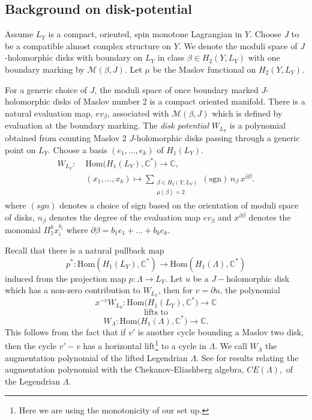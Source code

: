\documentclass[11pt, oneside,dvipsnames]{amsart}
\renewcommand{\to}{\rightarrow}
\newcommand{\Hom}{\text{Hom}}
\renewcommand{\to}{\rightarrow}
\newcommand{\<}{\langle}
\renewcommand{\>}{\rangle}
\newcommand{\bC}{\mathbb{C}}
\newcommand{\cM}{\mathcal{M}}
\renewcommand{\to}{\rightarrow}
\theoremstyle{definition}
\theoremstyle{definition}
\numberwithin{equation}{subsection}
\begin{document}
\subsection{Background on disk-potential}




Assume $L_Y$ is a compact, oriented, spin monotone Lagrangian in $Y$. Choose $J$ to be a compatible almost complex structure on $Y$. We  denote the moduli space of $J$-holomorphic disks with boundary on $L_Y$ in class $\beta \in H_2(Y,L_Y)$ with one boundary marking by $\cM(\beta, J)$.   Let $\mu$ be the Maslov functional on $H_2(Y,L_Y)$.

For a generic choice of $J$, the moduli space of once boundary marked $J$-holomorphic disks of Maslov number 2 is a compact oriented manifold. There is a natural evaluation map, $ev_\beta$, associated with $\cM(\beta,J)$ which is defined by evaluation at the boundary marking. The \textit{disk potential} $W_{L_Y}$ is a polynomial obtained from counting Maslov 2  $J$-holomorphic disks passing through a generic point on $L_Y$. Choose a basis $(e_1,\dots,e_k)$ of $H_1(L_Y)$.
\[
\begin{aligned}
W_{L_Y} :\;& \mathrm{Hom}\big(H_1(L_Y), \mathbb{C}^*\big) \longrightarrow \mathbb{C}, \\
& (x_1,\dots,x_k) \longmapsto 
\sum_{\substack{\beta \in H_2(Y,L_Y) \\ \mu(\beta)=2}}
(\mathrm{sgn})\, n_\beta \, x^{\partial \beta}.
\end{aligned}
\]
where $(sgn)$ denotes a choice of sign based on the orientation of moduli space of disks,  $n_\beta$ denotes the degree of the evaluation map $ev_\beta$ and $x^{\partial\beta}$ denotes the monomial $\Pi_{1}^k x_i^{b_i}$ where $\partial \beta = b_1e_1 +\dots+b_ke_k.$ 

\noindent Recall that there is a natural pullback map $$p^*:\Hom(H_1(L_Y),\bC^*)\to \Hom(H_1(\Lambda),\bC^*) $$ induced from the projection map $p: \Lambda \to L_Y$. Let $u$ be a $J-$holomorphic disk which has a non-zero contribution to $W_{L_Y}$, then for $v=\partial u$, the polynomial 
\begin{equation}\label{eq:movedpot}
x^{-v} W_{L_Y} :
\mathrm{Hom}\big(H_1(L_Y), \mathbb{C}^*\big)
\longrightarrow \mathbb{C}
\end{equation}
\[
\text{lifts to}
\]
\begin{equation}
W_\Lambda :
\mathrm{Hom}\big(H_1(\Lambda), \mathbb{C}^*\big)
\longrightarrow \mathbb{C}.
\end{equation}
\noindent This follows from the fact that if $v'$ is another cycle bounding a Maslov two disk, then the cycle $v' - v $ has a horizontal lift\footnote{Here we are using the monotonicity of our set up.} to a cycle in $\Lambda$. We call $W_\Lambda$ the augmentation polynomial of the lifted Legendrian $\Lambda$. See \cite[\S 2.1]{bcsw3} for results relating the augmentation polynomial with the Chekanov-Eliashberg algebra, $CE(\Lambda),$ of the Legendrian $\Lambda.$
\end{document}
